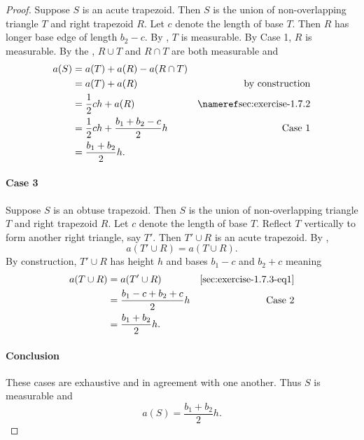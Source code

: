 \documentclass{report}
\begin{document}
\begin{proof}
    Suppose $S$ is an acute trapezoid.
    Then $S$ is the union of non-overlapping triangle $T$ and right trapezoid $R$.
    Let $c$ denote the length of base $T$.
    Then $R$ has longer base edge of length $b_2 - c$.
    By , $T$ is measurable.
    By Case 1, $R$ is measurable.
    By the , $R \cup T$ and $R \cap T$ are both
      measurable and
      \begin{align*}
        a(S)
          & = a(T) + a(R) - a(R \cap T) \\
          & = a(T) + a(R) & \text{by construction} \\
          & = \frac{1}{2}ch + a(R) & \textref{sec:exercise-1.7.2} \\
          & = \frac{1}{2}ch + \frac{b_1 + b_2 - c}{2}h & \text{Case 1} \\
          & = \frac{b_1 + b_2}{2}h.
      \end{align*}

  \paragraph{Case 3}%

    Suppose $S$ is an obtuse trapezoid.
    Then $S$ is the union of non-overlapping triangle $T$ and right trapezoid $R$.
    Let $c$ denote the length of base $T$.
    Reflect $T$ vertically to form another right triangle, say $T'$.
    Then $T' \cup R$ is an acute trapezoid.
    By ,
      \begin{equation}
        \label{sec:exercise-1.7.3-eq1}
        \tag{3.1}
        a(T' \cup R) = a(T \cup R).
      \end{equation}
    By construction, $T' \cup R$ has height $h$ and bases $b_1 - c$ and $b_2 + c$
      meaning
      \begin{align*}
        a(T \cup R)
          & = a(T' \cup R) & \eqref{sec:exercise-1.7.3-eq1} \\
          & = \frac{b_1 - c + b_2 + c}{2}h & \text{Case 2} \\
          & = \frac{b_1 + b_2}{2}h.
      \end{align*}

  \paragraph{Conclusion}%

    These cases are exhaustive and in agreement with one another.
    Thus $S$ is measurable and $$a(S) = \frac{b_1 + b_2}{2}h.$$


\end{proof}
\end{document}
